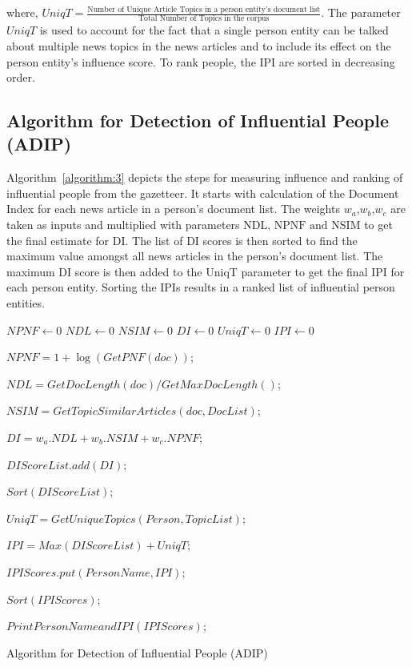 where, $UniqT = \frac{\text{Number of Unique Article Topics in a person entity's document list}}{\text{Total Number of Topics in the corpus}}$. The parameter $UniqT$  is used to account for the fact that a single person entity can be talked about multiple news topics in the news articles and to include its effect on the person entity's influence score. %
To rank people, the IPI are sorted in decreasing order. %
  
\subsection{Algorithm for Detection of Influential People (ADIP)}

Algorithm~\ref{algorithm:3} depicts the steps for measuring influence and ranking of influential people from the gazetteer. It starts with calculation of the Document Index for each news article in a person's document list. The weights $w_a$,$w_b$,$w_c$ are taken as inputs and multiplied with parameters $\text{NDL, NPNF and NSIM}$  to get the final estimate for DI. The list of DI scores is then sorted to find the maximum value amongst all news articles in the person's document list. The maximum DI score is then added to the UniqT parameter to get the final IPI for each person entity. Sorting the IPIs results in a ranked list of influential person entities.  


\begin{algorithm*}[!th]
\begin{algorithmic}
  

 $NPNF \leftarrow $0
 $NDL \leftarrow $0
 $NSIM \leftarrow $0
 $DI\leftarrow $0
 $UniqT\leftarrow $0
 $IPI\leftarrow $0\;  
  
     {
	{	
		$NPNF=1+\log (GetPNF(doc))$;
		
$NDL=GetDocLength(doc)/GetMaxDocLength()$;

		$ NSIM=GetTopicSimilarArticles(doc,DocList)$;

		$DI=w_a . NDL+w_b . NSIM+ w_c . NPNF$;
		
		$DIScoreList.add(DI)$;
 	 }
		$Sort(DIScoreList)$;

		$UniqT=GetUniqueTopics(Person,TopicList)$;

		$IPI=Max(DIScoreList)+UniqT$;

		$IPIScores.put(PersonName,IPI)$;
       }
	$Sort(IPIScores)$;

	$PrintPersonNameandIPI(IPIScores)$;

\EndFunction
\end{algorithmic}
\caption{Algorithm for Detection of Influential People (ADIP)}
\label{algorithm:3}
\end{algorithm*}


